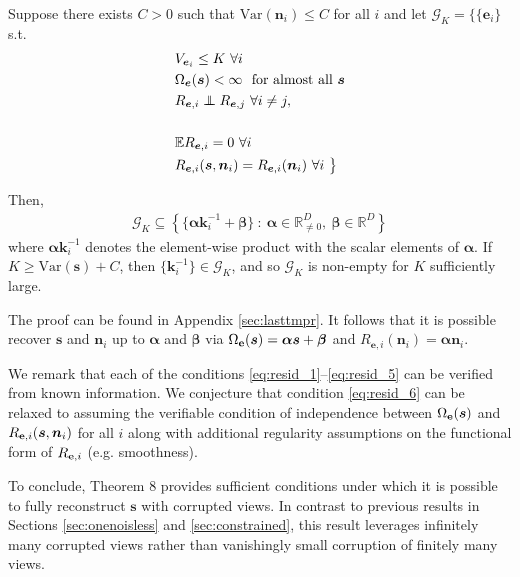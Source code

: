 \begin{theorem}
	\label{thm:lastthm}
	Suppose there exists $C>0$ such that $\text{Var}(\bm{n}_i) \leq C$ for all $i$ and let $\mathcal{G}_K = \big\lbrace
	\{\bm{e}_i \}$ s.t.
	\begin{align}
	& V_{\bm{e}_i} \leq K \ \forall i \label{eq:resid_1}\\
	& \Omega_{\bm{e}}(\bm{s}) < \infty \  \text{ for almost all } \bm{s} \label{eq:resid_2}\\
	&R_{\bm{e}, i} \independent R_{\bm{e}, j} \ \forall i \not= j, \label{eq:resid_3}\\
	\\    &\mathbb{E} R_{\bm{e}, i} = 0 \ \forall i \label{eq:resid_5} \\
	&R_{\bm{e}, i}(\bm{s}, \bm{n}_i) = R_{\bm{e}, i}(\bm{n}_i) \ \forall i \ \big\rbrace \label{eq:resid_6}
	\end{align}
	
	Then,
	\begin{align*}
	\mathcal{G}_K \subseteq\left\lbrace \{ \bm{\alpha} \bm{k}^{-1}_i + \bm{\beta} \} \ : \ \bm{\alpha} \in \mathbb{R}^{D}_{\not=0}, \: \bm{\beta} \in \mathbb{R}^{D} \right\rbrace
	\end{align*}
	where $\bm\alpha \bm{k}^{-1}_i$ denotes the element-wise product with the scalar elements of $\bm{\alpha}$.
	If $K \geq \text{Var}(\bm{s}) + C$, then $ \{ \bm{k}^{-1}_i \}  \in \mathcal{G}_K$,
	and so $\mathcal{G}_K$ is non-empty for $K$ sufficiently large.
\end{theorem}
The proof can be found in Appendix \ref{sec:lasttmpr}.
It follows that it is possible recover $\bm{s}$ and $\bm{n}_i$ up to $\bm{\alpha}$ and $\bm{\beta}$ via $\Omega_{\mathbf{e}}(\bm{s}) = \bm{\alpha}\bm{s} + \bm{\beta}$ and $R_{\bm{e}, i}(\bm{n}_i) = \bm{\alpha}\bm{n}_i$.

We remark that each of the conditions \ref{eq:resid_1}--\ref{eq:resid_5} can be verified from known information.
We conjecture that condition \ref{eq:resid_6} can be relaxed to assuming the verifiable condition of independence between $\Omega_{\mathbf{e}}(\bm{s})$ and $R_{\mathbf{e}, i}(\bm{s}, \bm{n}_i)$ for all $i$ along with additional regularity assumptions on the functional form of $R_{\mathbf{e}, i}$ (e.g. smoothness).

To conclude, Theorem 8 provides sufficient conditions under which it is possible to fully reconstruct $\bm{s}$ with corrupted views.
In contrast to previous results in Sections \ref{sec:onenoisless} and \ref{sec:constrained}, this result leverages infinitely many corrupted views rather than vanishingly small corruption of finitely many views.







